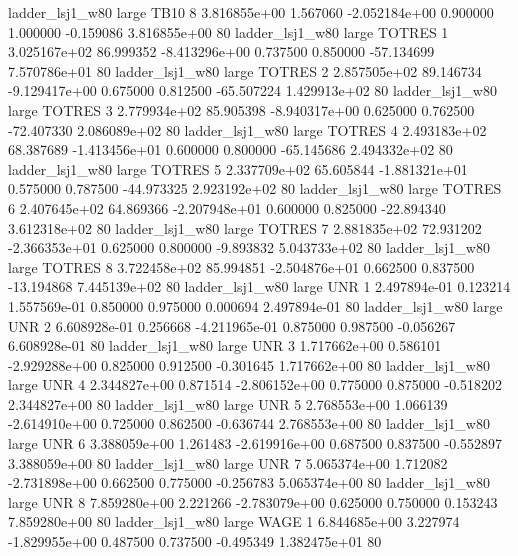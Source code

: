     ladder_lsj1_w80      large     TB10                 8 3.816855e+00      1.567060 -2.052184e+00 0.900000 1.000000      -0.159086 3.816855e+00 80
    ladder_lsj1_w80      large   TOTRES                 1 3.025167e+02     86.999352 -8.413296e+00 0.737500 0.850000     -57.134699 7.570786e+01 80
    ladder_lsj1_w80      large   TOTRES                 2 2.857505e+02     89.146734 -9.129417e+00 0.675000 0.812500     -65.507224 1.429913e+02 80
    ladder_lsj1_w80      large   TOTRES                 3 2.779934e+02     85.905398 -8.940317e+00 0.625000 0.762500     -72.407330 2.086089e+02 80
    ladder_lsj1_w80      large   TOTRES                 4 2.493183e+02     68.387689 -1.413456e+01 0.600000 0.800000     -65.145686 2.494332e+02 80
    ladder_lsj1_w80      large   TOTRES                 5 2.337709e+02     65.605844 -1.881321e+01 0.575000 0.787500     -44.973325 2.923192e+02 80
    ladder_lsj1_w80      large   TOTRES                 6 2.407645e+02     64.869366 -2.207948e+01 0.600000 0.825000     -22.894340 3.612318e+02 80
    ladder_lsj1_w80      large   TOTRES                 7 2.881835e+02     72.931202 -2.366353e+01 0.625000 0.800000      -9.893832 5.043733e+02 80
    ladder_lsj1_w80      large   TOTRES                 8 3.722458e+02     85.994851 -2.504876e+01 0.662500 0.837500     -13.194868 7.445139e+02 80
    ladder_lsj1_w80      large      UNR                 1 2.497894e-01      0.123214  1.557569e-01 0.850000 0.975000       0.000694 2.497894e-01 80
    ladder_lsj1_w80      large      UNR                 2 6.608928e-01      0.256668 -4.211965e-01 0.875000 0.987500      -0.056267 6.608928e-01 80
    ladder_lsj1_w80      large      UNR                 3 1.717662e+00      0.586101 -2.929288e+00 0.825000 0.912500      -0.301645 1.717662e+00 80
    ladder_lsj1_w80      large      UNR                 4 2.344827e+00      0.871514 -2.806152e+00 0.775000 0.875000      -0.518202 2.344827e+00 80
    ladder_lsj1_w80      large      UNR                 5 2.768553e+00      1.066139 -2.614910e+00 0.725000 0.862500      -0.636744 2.768553e+00 80
    ladder_lsj1_w80      large      UNR                 6 3.388059e+00      1.261483 -2.619916e+00 0.687500 0.837500      -0.552897 3.388059e+00 80
    ladder_lsj1_w80      large      UNR                 7 5.065374e+00      1.712082 -2.731898e+00 0.662500 0.775000      -0.256783 5.065374e+00 80
    ladder_lsj1_w80      large      UNR                 8 7.859280e+00      2.221266 -2.783079e+00 0.625000 0.750000       0.153243 7.859280e+00 80
    ladder_lsj1_w80      large     WAGE                 1 6.844685e+00      3.227974 -1.829955e+00 0.487500 0.737500      -0.495349 1.382475e+01 80
